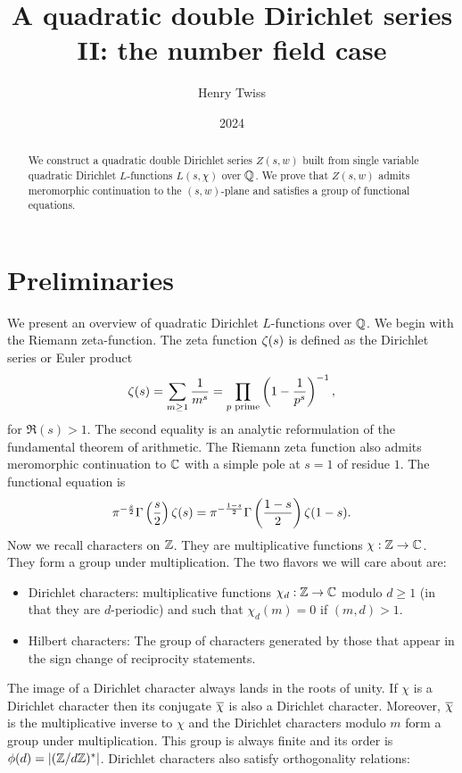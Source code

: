 \documentclass[12pt,reqno,oneside]{amsart}
\title{A quadratic double Dirichlet series II: the number field case}
\author{Henry Twiss}
\date{2024}
\begin{document}
\begin{abstract}
    We construct a quadratic double Dirichlet series $Z(s,w)$ built from single variable quadratic Dirichlet $L$-functions $L(s,\chi)$ over $\mathbb{Q}$. We prove that $Z(s,w)$ admits meromorphic continuation to the $(s,w)$-plane and satisfies a group of functional equations.
\end{abstract}

\maketitle

\section{Preliminaries}
    We present an overview of quadratic Dirichlet $L$-functions over $\mathbb{Q}$. We begin with the Riemann zeta-function. The zeta function $\zeta(s)$ is defined as the Dirichlet series or Euler product
    \[
        \zeta(s) = \sum_{m \ge 1}\frac{1}{m^{s}} = \prod_{\text{$p$ prime}}\left(1-\frac{1}{p^{s}}\right)^{-1},
    \]
    for $\Re(s) > 1$. The second equality is an analytic reformulation of the fundamental theorem of arithmetic. The Riemann zeta function also admits meromorphic continuation to $\mathbb{C}$ with a simple pole at $s = 1$ of residue $1$. The functional equation is
    \[
        \pi^{-\frac{s}{2}}\Gamma\left(\frac{s}{2}\right)\zeta(s) = \pi^{-\frac{1-s}{2}}\Gamma\left(\frac{1-s}{2}\right)\zeta(1-s).
    \]
    Now we recall characters on $\mathbb{Z}$. They are multiplicative functions $\chi:\mathbb{Z} \to \mathbb{C}$. They form a group under multiplication. The two flavors we will care about are:
    
    \begin{itemize}
        \item Dirichlet characters: multiplicative functions $\chi_{d}:\mathbb{Z} \to \mathbb{C}$ modulo $d \ge 1$ (in that they are $d$-periodic) and such that $\chi_{d}(m) = 0$ if $(m,d) > 1$.
        \item Hilbert characters: The group of characters generated by those that appear in the sign change of reciprocity statements.
    \end{itemize}
    
    The image of a Dirichlet character always lands in the roots of unity. If $\chi$ is a Dirichlet character then its conjugate $\overline{\chi}$ is also a Dirichlet character. Moreover, $\overline{\chi}$ is the multiplicative inverse to $\chi$ and the Dirichlet characters modulo $m$ form a group under multiplication. This group is always finite and its order is $\phi(d) = |(\mathbb{Z}/d\mathbb{Z})^{\ast}|$. Dirichlet characters also satisfy orthogonality relations:
\end{document}
